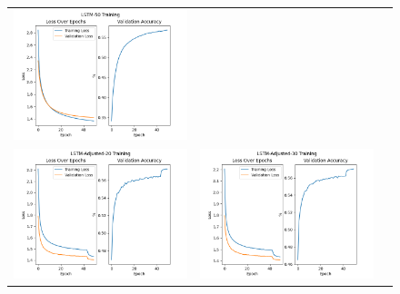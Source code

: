 \documentclass{article}
\begin{document}
\begin{enumerate}[label=1\alph*. ]
\begin{figure}[htb]
\begin{tabularx}{\textwidth}{XXX}
          \includegraphics{images/LSTM-50_training_new.png} \\
          \includegraphics{images/LSTM-Adjusted-20_training_new.png} &
          \includegraphics{images/LSTM-Adjusted-30_training_new.png} &

\end{tabularx}
\end{figure}
\end{enumerate}
\end{document}
